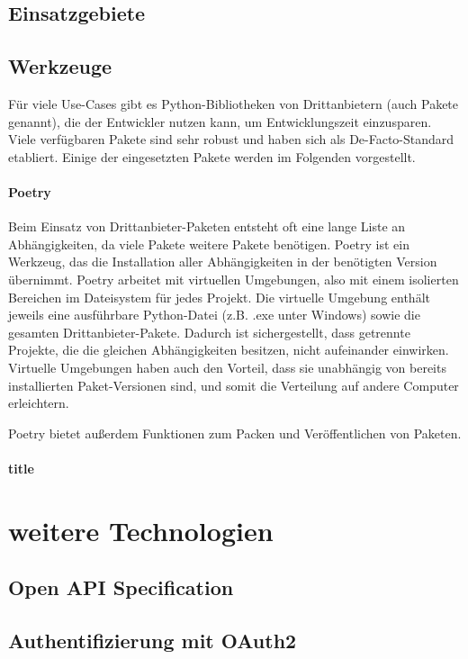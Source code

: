 	\subsection{Einsatzgebiete}
	\subsection{Werkzeuge}
		Für viele Use-Cases gibt es Python-Bibliotheken von Drittanbietern (auch Pakete genannt), die der Entwickler nutzen kann, um Entwicklungszeit einzusparen. Viele verfügbaren Pakete sind sehr robust und haben sich als De-Facto-Standard etabliert. Einige der eingesetzten Pakete werden im Folgenden vorgestellt.
		\paragraph{Poetry} Beim Einsatz von Drittanbieter-Paketen entsteht oft eine lange Liste an Abhängigkeiten, da viele Pakete weitere Pakete benötigen. Poetry ist ein Werkzeug, das die Installation aller Abhängigkeiten in der benötigten Version übernimmt. Poetry arbeitet mit virtuellen Umgebungen, also mit einem isolierten Bereichen im Dateisystem für jedes Projekt. Die virtuelle Umgebung enthält jeweils eine ausführbare Python-Datei (z.B. .exe unter Windows) sowie die gesamten Drittanbieter-Pakete. Dadurch ist sichergestellt, dass getrennte Projekte, die die gleichen Abhängigkeiten besitzen, nicht aufeinander einwirken. Virtuelle Umgebungen haben auch den Vorteil, dass sie unabhängig von bereits installierten Paket-Versionen sind, und somit die Verteilung auf andere Computer erleichtern.
		
		Poetry bietet außerdem Funktionen zum Packen und Veröffentlichen von Paketen.
		\paragraph{title}
	
\section{weitere Technologien}
	\subsection{Open API Specification}
	\subsection{Authentifizierung mit OAuth2}
	